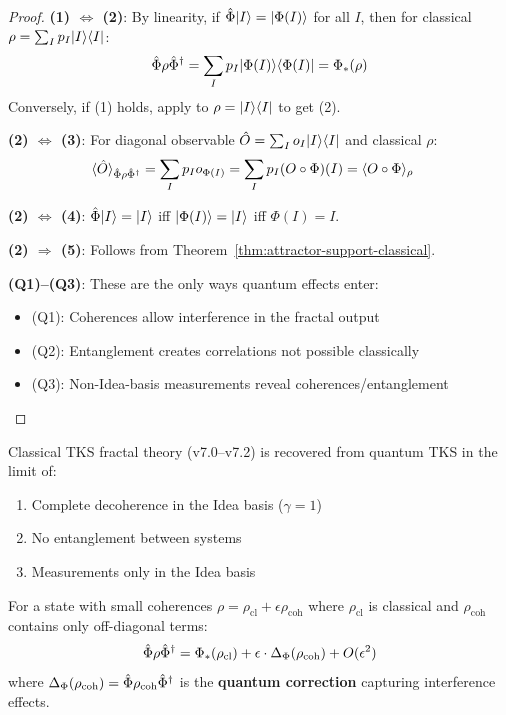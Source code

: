 \begin{proof}
\textbf{(1) $\Leftrightarrow$ (2)}: By linearity, if $\hat{\Phi}|I\rangle = |\Phi(I)\rangle$ for all $I$, then for classical $\rho = \sum_I p_I |I\rangle\langle I|$:
\[
\hat{\Phi}\rho\hat{\Phi}^\dagger = \sum_I p_I |\Phi(I)\rangle\langle \Phi(I)| = \Phi_*(\rho)
\]
Conversely, if (1) holds, apply to $\rho = |I\rangle\langle I|$ to get (2).

\textbf{(2) $\Leftrightarrow$ (3)}: For diagonal observable $\hat{O} = \sum_I o_I |I\rangle\langle I|$ and classical $\rho$:
\begin{align*}
\langle \hat{O} \rangle_{\hat{\Phi}\rho\hat{\Phi}^\dagger} &= \sum_I p_I o_{\Phi(I)} = \sum_I p_I (O \circ \Phi)(I) = \langle O \circ \Phi \rangle_\rho
\end{align*}

\textbf{(2) $\Leftrightarrow$ (4)}: $\hat{\Phi}|I\rangle = |I\rangle$ iff $|\Phi(I)\rangle = |I\rangle$ iff $\Phi(I) = I$.

\textbf{(2) $\Rightarrow$ (5)}: Follows from Theorem~\ref{thm:attractor-support-classical}.

\textbf{(Q1)--(Q3)}: These are the only ways quantum effects enter:
\begin{itemize}
  \item (Q1): Coherences allow interference in the fractal output
  \item (Q2): Entanglement creates correlations not possible classically
  \item (Q3): Non-Idea-basis measurements reveal coherences/entanglement
\end{itemize}
\end{proof}

\begin{corollary}
\label{cor:classical-tks}
Classical TKS fractal theory (v7.0--v7.2) is recovered from quantum TKS in the limit of:
\begin{enumerate}
  \item Complete decoherence in the Idea basis ($\gamma = 1$)
  \item No entanglement between systems
  \item Measurements only in the Idea basis
\end{enumerate}
\end{corollary}

\begin{theorem}
\label{thm:quantum-corrections}
For a state with small coherences $\rho = \rho_{\mathrm{cl}} + \epsilon \rho_{\mathrm{coh}}$ where $\rho_{\mathrm{cl}}$ is classical and $\rho_{\mathrm{coh}}$ contains only off-diagonal terms:
\[
\hat{\Phi}\rho\hat{\Phi}^\dagger = \Phi_*(\rho_{\mathrm{cl}}) + \epsilon \cdot \Delta_\Phi(\rho_{\mathrm{coh}}) + O(\epsilon^2)
\]
where $\Delta_\Phi(\rho_{\mathrm{coh}}) = \hat{\Phi}\rho_{\mathrm{coh}}\hat{\Phi}^\dagger$ is the \textbf{quantum correction} capturing interference effects.
\end{theorem}

